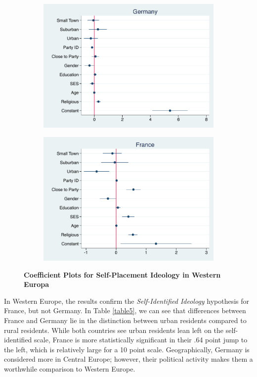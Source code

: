 \documentclass[12pt, titlepage]{article}
\newcommand\e{\emph}
\newcommand\tb{\textbf}
\begin{document}
\begin{figure}[H]
	\centering
	\begin{subfigure}[b]{0.475\textwidth}
		\centering
		\includegraphics[width=\textwidth]{IdeologyCoef/Germany}
	\end{subfigure}
	\hfill
	\begin{subfigure}[b]{0.475\textwidth}  
		\centering 
		\includegraphics[width=\textwidth]{IdeologyCoef/France}
	\end{subfigure}
	\caption[ \tb{Self-Placement Ideology - Western Europe} ]
	{\tb {Coefficient Plots for Self-Placement Ideology in Western Europa} }
	\label{WestEuroIdeo}
\end{figure}

In Western Europe, the results confirm the \e{Self-Identified Ideology} hypothesis for France, but not Germany. In Table \ref{table5}, we can see that differences between France and Germany lie in the distinction between urban residents compared to rural residents. While both countries see urban residents lean left on the self-identified scale, France is more statistically significant in their .64 point jump to the left, which is relatively large for a 10 point scale. Geographically, Germany is considered more in Central Europe; however, their political activity makes them a worthwhile comparison to Western Europe.
\end{document}
